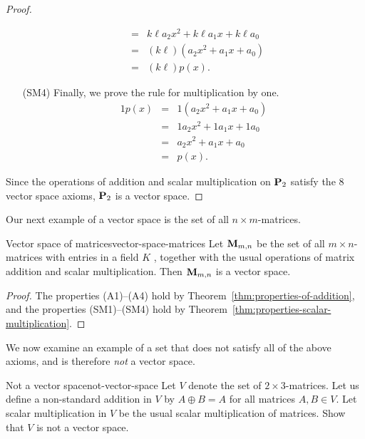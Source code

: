 \begin{proof}
\begin{itemize}
\begin{eqnarray*}
               &=&  k\ell a_2x^2 + k\ell a_1x + k\ell a_0 \\
               &=& (k\ell) (a_2x^2 + a_1x + a_0) \\
               &=& (k\ell) p(x).
    \end{eqnarray*}
  \item[(SM4)] Finally, we prove the rule for multiplication by one.
    \begin{eqnarray*}
      1p(x) &=& 1 (a_2x^2 + a_1x + a_0) \\
            &=& 1a_2x^2 + 1a_1x + 1a_0 \\
            &=& a_2x^2 + a_1x + a_0 \\
            &=& p(x).
    \end{eqnarray*}
  \end{itemize}
  Since the operations of addition and scalar multiplication on
  $\mathbf{P}_2$ satisfy the $8$ vector space axioms, $\mathbf{P}_2$ is a vector
  space.
\end{proof}

Our next example of a vector space is the set of all
$n\times m$-matrices.

\begin{example}{Vector space of matrices}{vector-space-matrices}
  Let $\mathbf{M}_{m,n}$%
   be the set of all $m\times n$-matrices
  with entries in a field $K$%
  , together with the usual operations
  of matrix addition and scalar multiplication. Then $\mathbf{M}_{m,n}$ is a
  vector space.
\end{example}

\begin{proof}
  The properties (A1)--(A4) hold by
  Theorem~\ref{thm:properties-of-addition}, and the properties
  (SM1)--(SM4) hold by Theorem~\ref{thm:properties-scalar-multiplication}.
\end{proof}

We now examine an example of a set that does not satisfy all of the
above axioms, and is therefore \textit{not} a vector space.

\begin{example}{Not a vector space}{not-vector-space}
  Let $V$ denote the set of $2 \times 3$-matrices. Let us define a
  non-standard addition in $V$ by $A \oplus B = A$ for all matrices
  $A,B\in V$. Let scalar multiplication in $V$ be the usual scalar
  multiplication of matrices. Show that $V$ is not a vector space.
\end{example}


